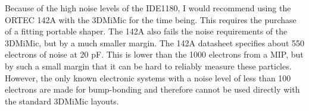 \documentclass[../main/thesis.tex]{subfiles}
\begin{document}
Because of the high noise levels of the IDE1180, I would recommend using the ORTEC 142A with the 3DMiMic for the time being. This requires the purchase of a fitting portable shaper. The 142A also fails the noise requirements of the 3DMiMic, but by a much smaller margin. The 142A datasheet specifies about 550 electrons of noise at 20 pF. This is lower than the 1000 electrons from a \gls{MIP}, but by such a small margin that it can be hard to reliably measure these particles. However, the only known electronic systems with a noise level of less than 100 electrons are made for bump-bonding and therefore cannot be used directly with the standard 3DMiMic layouts.
\end{document}

